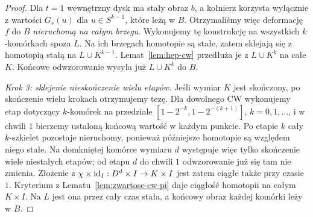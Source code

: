 \begin{proof}
Dla $t=1$ wewnętrzny dysk ma stały obraz $b$,
a kołnierz korzysta wyłącznie z wartości $G_s(u)$ dla $u\in S^{k-1}$,
które leżą w $B$. Otrzymaliśmy więc deformację $f$ do $B$
\emph{nieruchomą na całym brzegu}.
Wykonujemy tę konstrukcję na wszystkich $k$-komórkach spoza $L$.
Na ich brzegach homotopie są stałe, zatem sklejają się
z homotopią stałą na $L\cup K^{k-1}$.
Lemat~\ref{lem:hep-cw} przedłuża je z $L\cup K^k$ na całe $K$.
Końcowe odwzorowanie wysyła już $L\cup K^k$ do $B$.

\emph{Krok 3: sklejenie nieskończenie wielu etapów.}
Jeśli wymiar $K$ jest skończony, po skończenie wielu krokach
otrzymujemy tezę. Dla dowolnego CW wykonujemy etap dotyczący
$k$-komórek na przedziale
$[1-2^{-k},1-2^{-(k+1)}]$, $k=0,1,\ldots$,
i w chwili $1$ bierzemy ustaloną końcową wartość w każdym punkcie.
Po etapie $k$ cały $k$-szkielet pozostaje nieruchomy,
ponieważ późniejsze homotopie są względem niego stałe.
Na domkniętej komórce wymiaru $d$ występuje więc tylko
skończenie wiele niestałych etapów; od etapu $d$ do chwili $1$
odwzorowanie już się tam nie zmienia.
Złożenie z $\chi\times\mathrm{id}_I:D^d\times I\to K\times I$
jest zatem ciągłe także przy czasie $1$.
Kryterium z Lematu~\ref{lem:zwartosc-cw-pi} daje ciągłość
homotopii na całym $K\times I$. Na $L$ jest ona przez cały czas
stała, a końcowy obraz każdej komórki leży w $B$.
\end{proof}

